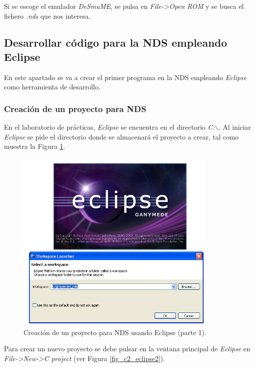 Si se escoge el emulador \textit{DeSmuME}, se pulsa en \textit{File->Open ROM} y se busca el fichero \textit{.nds} que nos interesa.

\subsection{Desarrollar código para la NDS empleando Eclipse}
\label{sin_eclipse}
En este apartado se va a crear el primer programa en la NDS empleando \textit{Eclipse} como herramienta de desarrollo.

\subsubsection{Creación de un proyecto para NDS}
En  el laboratorio de prácticas, \textit{Eclipse} se encuentra en el directorio \textit{C:$\backslash$}. Al iniciar \textit{Eclipse} se pide el directorio donde se almacenará el proyecto a crear, tal como muestra la Figura \ref{fig_c2_eclipse1}.

\begin{figure}[t]
\centering
\includegraphics[height=9cm]{./Figuras/C2/c2_eclipse1.png}
\caption{Creación de un proyecto para NDS usando Eclipse (parte 1).}
\label{fig_c2_eclipse1}
\end{figure}


Para crear un nuevo proyecto se debe pulsar en la ventana principal de \textit{Eclipse} en \textit{File->New->C project} (ver Figura \ref{fig_c2_eclipse2}). 

